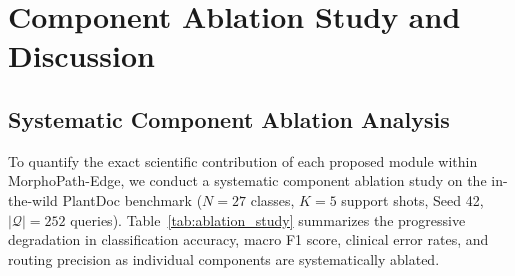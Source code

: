\section{Component Ablation Study and Discussion}
\label{sec:ablation_discussion}

\subsection{Systematic Component Ablation Analysis}
\label{subsec:ablation_analysis}
To quantify the exact scientific contribution of each proposed module within MorphoPath-Edge, we conduct a systematic component ablation study on the in-the-wild PlantDoc benchmark ($N=27$ classes, $K=5$ support shots, Seed 42, $|\mathcal{Q}|=252$ queries). Table~\ref{tab:ablation_study} summarizes the progressive degradation in classification accuracy, macro F1 score, clinical error rates, and routing precision as individual components are systematically ablated.

\begin{table}[htbp]
\footnotesize
\centering
\renewcommand{\arraystretch}{0.90}
\setlength{\tabcolsep}{3pt}
\caption{Systematic Component Ablation Study on PlantDoc ($N=27, K=5$, Seed 42, $|\mathcal{Q}|=252$). Performance deltas ($\Delta$) are measured relative to the complete full model.}
\label{tab:ablation_study}
\end{table}

